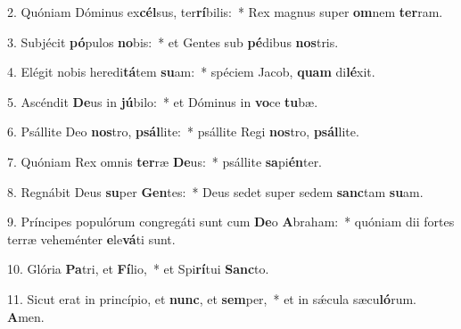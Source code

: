 2. Quóniam Dóminus ex\textbf{cél}sus, ter\textbf{rí}bilis:~*  Rex magnus super \textbf{om}nem \textbf{ter}ram.\

3. Subjécit \textbf{pó}pulos \textbf{no}bis:~*  et Gentes sub \textbf{pé}dibus \textbf{nos}tris.\

4. Elégit nobis heredi\textbf{tá}tem \textbf{su}am:~*  spéciem Jacob, \textbf{quam} di\textbf{lé}xit.\

5. Ascéndit \textbf{De}us in \textbf{jú}bilo:~*  et Dóminus in \textbf{vo}ce \textbf{tu}bæ.\

6. Psállite Deo \textbf{nos}tro, \textbf{psál}lite:~*  psállite Regi \textbf{nos}tro, \textbf{psál}lite.\

7. Quóniam Rex omnis \textbf{ter}ræ \textbf{De}us:~*  psállite \textbf{sa}pi\textbf{én}ter.\

8. Regnábit Deus \textbf{su}per \textbf{Gen}tes:~*  Deus sedet super sedem \textbf{sanc}tam \textbf{su}am.\

9. Príncipes populórum congregáti sunt cum \textbf{De}o \textbf{A}braham:~*  quóniam dii fortes terræ veheménter \textbf{e}le\textbf{vá}ti sunt.\

10. Glória \textbf{Pa}tri, et \textbf{Fí}lio,~*  et Spi\textbf{rí}tui \textbf{Sanc}to.\

11. Sicut erat in princípio, et \textbf{nunc}, et \textbf{sem}per,~*  et in sǽcula sæcu\textbf{ló}rum. \textbf{A}men.\

